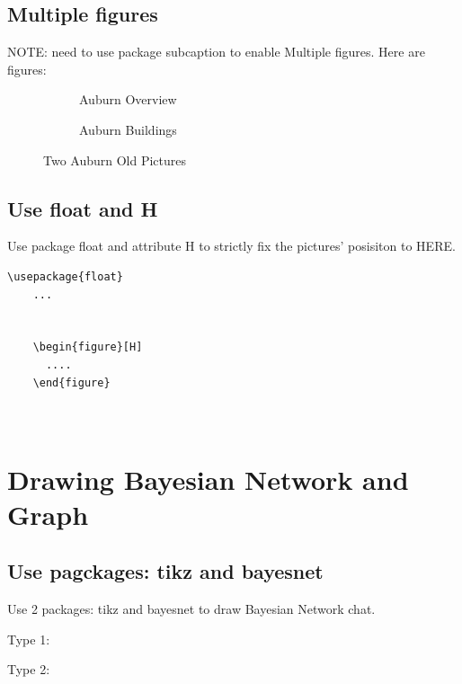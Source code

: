 \documentclass{article}
\begin{document}
  \subsection{Multiple figures}
  NOTE: need to use package subcaption to enable Multiple figures.
  Here are figures:
  \begin{figure}[H]
    \centering
    \begin{subfigure}[b]{0.4\linewidth}
      \caption{Auburn Overview}
    \end{subfigure}
    \begin{subfigure}[b]{0.4\linewidth}
      \caption{Auburn Buildings}
    \end{subfigure}
    \caption{Two Auburn Old Pictures}
    \label{fig:twoPic}
  \end{figure}

  \subsection{Use float and H}
  Use package float and attribute H to strictly fix the pictures' posisiton to HERE.

  \begin{lstlisting}[caption={An Example}]
    \usepackage{float}
    ...


    \begin{figure}[H]
      ....
    \end{figure}

    
  \end{lstlisting}
  \newpage



  \section{Drawing Bayesian Network and Graph}
  \subsection{Use pagckages: tikz and bayesnet}
  Use 2 packages: tikz and bayesnet to draw Bayesian Network chat.
  \break

  Type 1:


  Type 2:

  
\end{document}
